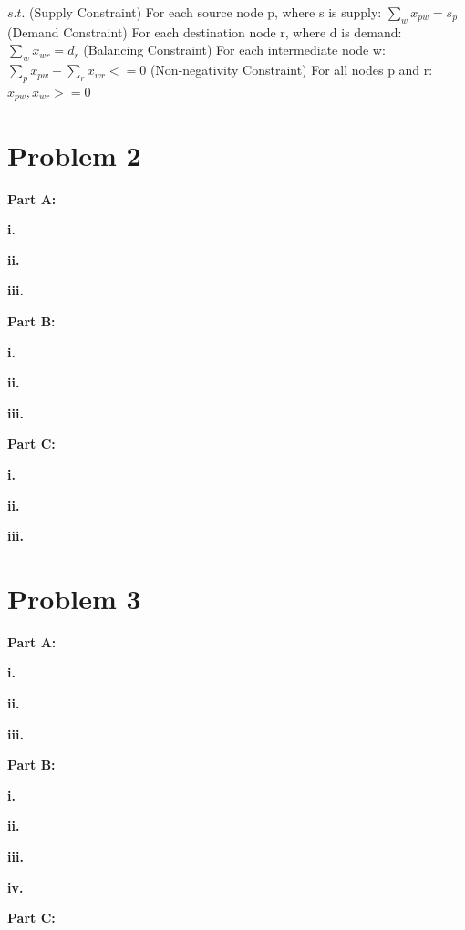 \documentclass[paper=a4, fontsize=11pt]{scrartcl} %
\numberwithin{equation}{section} %
\numberwithin{figure}{section} %
\numberwithin{table}{section} %
\begin{document}
$s.t.$\newline
(Supply Constraint) For each source node p, where s is supply: $\sum_{w}{x_{pw}} = s_{p}$\newline
(Demand Constraint) For each destination node r, where d is demand: $\sum_{w}{x_{wr}} = d_{r}$\newline
(Balancing Constraint) For each intermediate node w: $\sum_{p}{x_{pw}} - \sum_{r}{x_{wr}} <= 0$\newline
(Non-negativity Constraint) For all nodes p and r: $x_{pw}, x_{wr} >= 0$\newline


\section{Problem 2}
\textbf{Part A:}

    \textbf{i.}
    
    \textbf{ii.}
    
    \textbf{iii.}
    
\textbf{Part B:}
    
    \textbf{i.}
    
    \textbf{ii.}
    
    \textbf{iii.}
    
\textbf{Part C:}
	
    \textbf{i.}
    
    \textbf{ii.}
    
    \textbf{iii.}
    
\section{Problem 3}
\textbf{Part A:}

    \textbf{i.}
    
    \textbf{ii.}
    
    \textbf{iii.}
    
\textbf{Part B:}
    
    \textbf{i.}
    
    \textbf{ii.}
    
    \textbf{iii.}
    
    \textbf{iv.}
    
\textbf{Part C:}
	
\end{document}
